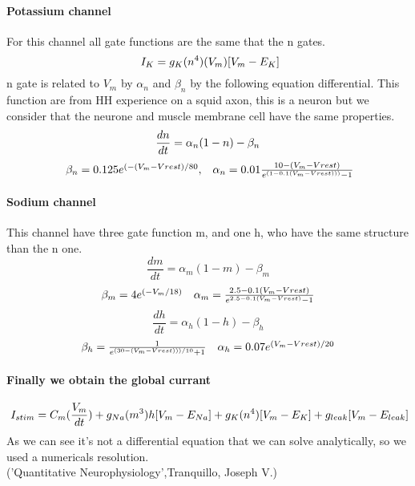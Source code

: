 \documentclass[a4paper,10pt]{report}
\begin{document}
 \paragraph{Potassium channel}
 For this channel all gate functions are the same that the n gates.
 $$
 \ I_{K}=g_{K}(n^4)(V_{m})[V_{m}-E_{K}] \\
 $$
 n gate is related to $V_{m}$ by $\alpha_{n}$ and $\beta_{n}$ by the following equation differential. This function are from HH experience on a squid axon, this is a neuron but we consider that the neurone and muscle membrane cell have the same properties. 
 $$
 \frac{dn}{dt} = \alpha_{n}(1-n)- \beta_{n} \\
 $$
 $$
 \begin{array}{l c} 
 \ \beta_{n}= 0.125e^{(-(V_{m}-V{rest})/80} , & \alpha_{n}=0.01 \frac{10-(V_{m}-V{rest})}{e^{(1-0.1(V_{m}-V{rest})))}-1} \\
\end{array}
 $$

\paragraph{Sodium channel}
This channel have three gate function m, and one h, who have the same structure than the n one.
$$
\frac{dm}{dt} = \alpha_{m}(1-m)- \beta_{m}
$$
$$
 \begin{array}{l c} 
 \beta_{m}= 4e^{(-V_{m}/18)} & \alpha_{m}= \frac{2.5-0.1(V_{m}-V{rest})}{e^{2.5-0.1(V_{m}-V{rest})}-1} \\
 \end{array}
 $$
 $$
 \frac{dh}{dt} = \alpha_{h}(1-h)- \beta_{h}
 $$
 $$
 \begin{array}{l c}
 \beta_{h}= \frac{1}{e^{(30-(V_{m}-V{rest})))/10}+1} & \alpha_{h}=0.07 e^{(V_{m}-V{rest})/20} \\
 \end{array}
$$ 
 
\paragraph{Finally we obtain the global currant}
$$
\ I_{stim} = C_{m}(\frac{V_{m}}{dt})+g_{Na}(m^3)h[V_{m}-E_{Na}]+g_{K}(n^4)[V_{m}-E_{K}]+g_{leak}[V_{m}-E_{leak}] \\
$$
As we can see it's not a differential equation that we can solve analytically, so we used a numericals resolution.\\
('Quantitative Neurophysiology',Tranquillo, Joseph V.)
\end{document}
